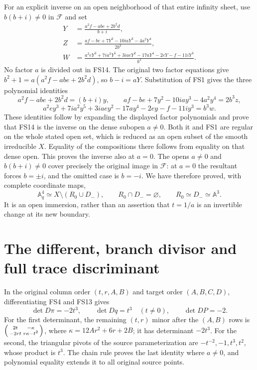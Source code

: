 For an explicit inverse on an open neighborhood of that
entire infinity sheet, use $b(b+i)\ne0$ in $\mathcal F$
and set
\begin{align}
Y&=\frac{a^2f-abe+2b^2d}{b+i},\nonumber\\
Z&=\frac{af-be+7Y^2-10iaY^3-4a^2Y^4}{2b^3},\nonumber\\
W&=\frac{a^2eY^3+7ia^2Y^5+3iaeY^2-17aY^4
                       -2eY-f-11iY^3}{b^3}.
\tag{FS14}
\end{align}
No factor $a$ is divided out in FS14. The original two
factor equations give
$b^2+1=a(a^2f-abe+2b^2d)$, so $b-i=aY$.
Substitution of FS1 gives the three polynomial identities
\[
a^2f-abe+2b^2d=(b+i)y,\qquad
af-be+7y^2-10iay^3-4a^2y^4=2b^3z,
\]
\[
a^2ey^3+7ia^2y^5+3iaey^2-17ay^4-2ey-f-11iy^3=b^3w.
\]
These identities follow by expanding the displayed factor
polynomials and prove that FS14 is the inverse on the
dense subopen $a\ne0$. Both it and FS1 are regular on
the whole stated open set, which is reduced as an open
subset of the smooth irreducible $X$. Equality of the
compositions there follows from equality on that dense
open. This proves the inverse also at $a=0$.
The opens $a\ne0$ and $b(b+i)\ne0$ cover precisely the
original image in $\mathcal F$: at $a=0$ the resultant
forces $b=\pm i$, and the omitted case is $b=-i$.
We have therefore proved, with complete coordinate maps,
\begin{equation}
\mathbb A^4_q\simeq X\setminus(R_0\cup D_-),\qquad
R_0\cap D_-=\varnothing,\qquad
R_0\simeq D_-\simeq\mathbb A^3 .
\tag{FS15}
\end{equation}
It is an open immersion, rather than an assertion that
$t=1/a$ is an invertible change at its new boundary.

\section{The different, branch divisor and full trace discriminant}
In the original column order $(t,r,A,B)$ and target order
$(A,B,C,D)$, differentiating FS4 and FS13 gives
\begin{equation}
\det D\pi=-2t^3,\qquad
\det Dq=t^3\quad(t\ne0),\qquad
\det DP=-2.
\tag{FS16}
\end{equation}
For the first determinant, the remaining $(t,r)$ minor
after the $(A,B)$ rows is
$\begin{psmallmatrix}2t&-\kappa\\-2rt&r\kappa-t^2\end{psmallmatrix}$,
where $\kappa=12Ar^2+6r+2B$; it has determinant $-2t^3$.
For the second, the triangular pivots of the source
parameterization are $-t^{-2},-1,t^3,t^2$, whose product
is $t^3$. The chain rule proves the last identity where
$a\ne0$, and polynomial equality extends it to all original
source points.


